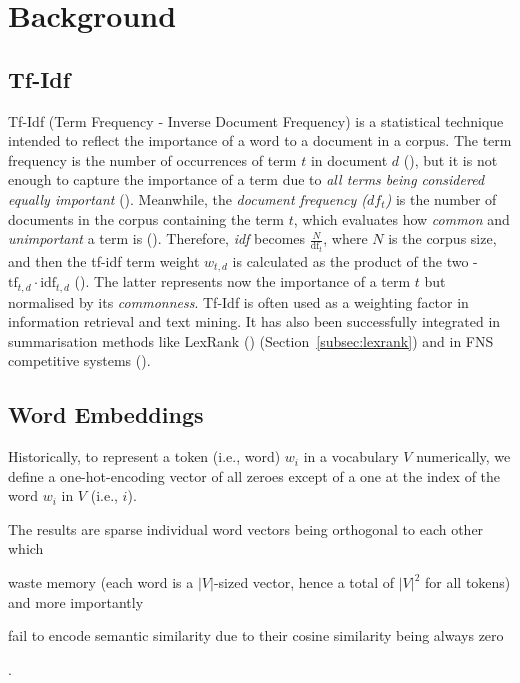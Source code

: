 \section{Background}\label{sec:background}

\subsection{Tf-Idf}\label{subsec:tfidf}
Tf-Idf (Term Frequency - Inverse Document Frequency) is a statistical technique intended to reflect the importance of a word to a document in a corpus.
The term frequency is the number of occurrences of term $t$ in document $d$ (\cite{luhn1957termfreq}), but it is not enough to capture the importance of a term due to \emph{all terms being considered equally important} (\cite{manning_raghavan_schutze_2008}).
Meanwhile, the \emph{document frequency ($df_{t}$)} is the number of documents in the corpus containing the term $t$, which evaluates how \emph{common} and \emph{unimportant} a term is (\cite{leskovec_rajaraman_ullman_2020}).
Therefore, \emph{idf} becomes $\frac{N}{\text{df}_{t}}$, where $N$ is the corpus size, and then the tf-idf term weight $w_{t,d}$ is calculated as the product of the two - $\text{tf}_{t,d} \cdot \text{idf}_{t,d}$ (\cite{jurafsky2000}).
The latter represents now the importance of a term $t$ but normalised by its \emph{commonness}.
Tf-Idf is often used as a weighting factor in information retrieval and text mining.
It has also been successfully integrated in summarisation methods like LexRank (\cite{Erkan2004LexRankGC}) (Section~\ref{subsec:lexrank}) and in FNS competitive systems (\cite{litvak2021tiber, el-haj-ogden-2022-financial}).

\subsection{Word Embeddings}\label{subsec:word-embeddings}
Historically, to represent a token (i.e., word) $w_{i}$ in a vocabulary $V$ numerically, we define a one-hot-encoding vector of all zeroes except of a one at the index of the word $w_{i}$ in $V$ (i.e., $i$).

The results are sparse individual word vectors being orthogonal to each other which \begin{enumerate*}
    \item waste memory (each word is a $|V|$-sized vector, hence a total of $|V|^{2}$ for all tokens) and more importantly
    \item fail to encode semantic similarity due to their cosine similarity being always zero
\end{enumerate*}.



